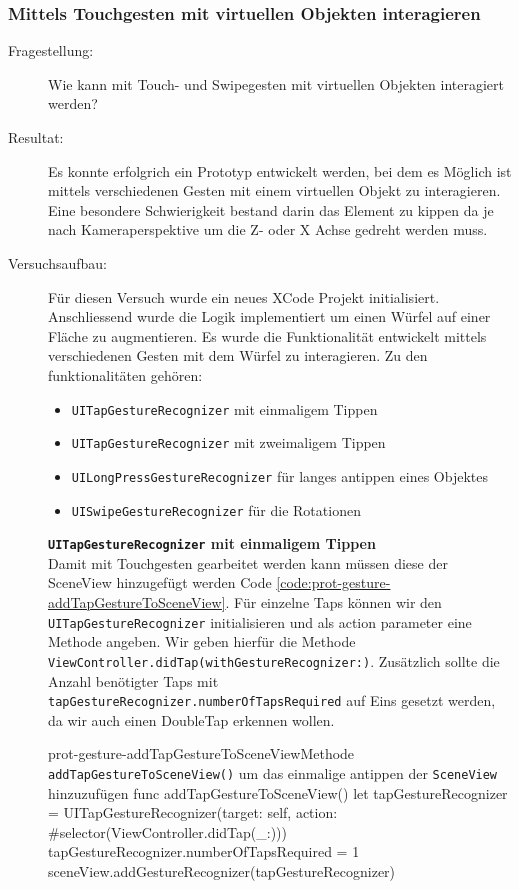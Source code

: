 \subsubsection{Mittels Touchgesten mit virtuellen Objekten interagieren}
\begin{description}
	\item[Fragestellung:] Wie kann mit Touch- und Swipegesten mit virtuellen Objekten interagiert werden?
	\item[Resultat:] Es konnte erfolgrich ein Prototyp entwickelt werden, bei dem es Möglich ist mittels verschiedenen Gesten mit einem virtuellen Objekt zu interagieren. Eine besondere Schwierigkeit bestand darin das Element zu kippen da je nach Kameraperspektive um die Z- oder X Achse gedreht werden muss. 
    \item[Versuchsaufbau:] Für diesen Versuch wurde ein neues XCode Projekt initialisiert. Anschliessend wurde die Logik implementiert um einen Würfel auf einer Fläche zu augmentieren. Es wurde die Funktionalität entwickelt mittels verschiedenen Gesten mit dem Würfel zu interagieren. Zu den funktionalitäten gehören:
    
    
    \begin{itemize}
        \item \texttt{UITapGestureRecognizer} mit einmaligem Tippen
        \item \texttt{UITapGestureRecognizer} mit zweimaligem Tippen
        \item \texttt{UILongPressGestureRecognizer} für langes antippen eines Objektes
        \item \texttt{UISwipeGestureRecognizer} für die Rotationen
    \end{itemize}


    \textbf{\texttt{UITapGestureRecognizer} mit einmaligem Tippen}\label{textbf:tap-gesture-recognizer}\\
    Damit mit Touchgesten gearbeitet werden kann müssen diese der SceneView hinzugefügt werden Code \ref{code:prot-gesture-addTapGestureToSceneView}. Für einzelne Taps können wir den \texttt{UITapGestureRecognizer} initialisieren und als action parameter eine Methode angeben. Wir geben hierfür die Methode \texttt{ViewController.didTap(withGestureRecognizer:)}. Zusätzlich sollte die Anzahl benötigter Taps mit \texttt{tapGestureRecognizer.numberOfTapsRequired} auf Eins gesetzt werden, da wir auch einen DoubleTap erkennen wollen. 
    \begin{code}{prot-gesture-addTapGestureToSceneView}{Methode \texttt{addTapGestureToSceneView()} um das einmalige antippen der \texttt{SceneView} hinzuzufügen}
    func addTapGestureToSceneView() {
        let tapGestureRecognizer = UITapGestureRecognizer(target: self, action: #selector(ViewController.didTap(\_:)))
        tapGestureRecognizer.numberOfTapsRequired = 1
        sceneView.addGestureRecognizer(tapGestureRecognizer)
    }
    \end{code}


\end{description}
